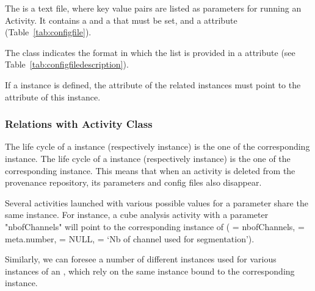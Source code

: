 The  is a text file, where key value pairs are listed as parameters for running an Activity. It contains a  and a  that must be set, and a  attribute (Table~\ref{tab:configfile}).

The  class indicates the format in which the list is provided in a  attribute (see Table~\ref{tab:configfiledescription}). 

If a  instance is defined, the  attribute of the related  instances must point to the  attribute of this  instance.


\subsubsection{Relations with Activity Class}

The life cycle of a  instance (respectively  instance) is the one of the corresponding  instance. 
The life cycle of a  instance (respectively  instance) is the one of the corresponding  instance. 
This means that when an activity is deleted from the provenance repository, its parameters and config files also disappear. 

Several activities launched with various possible values for a parameter share the same  instance. 
For instance, a cube analysis activity with a parameter "nbofChannels" will point to the corresponding instance of  ( = nbofChannels,  = meta.number,  = NULL,  = ‘Nb of channel used for segmentation’). 

Similarly, we can foresee a number of different  instances used for various instances of an , which rely on the same  instance bound to the corresponding  instance. 


